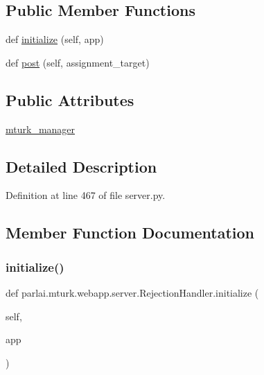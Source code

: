 \subsection*{Public Member Functions}
\begin{DoxyCompactItemize}
\item 
def \hyperlink{classparlai_1_1mturk_1_1webapp_1_1server_1_1RejectionHandler_af55902f1aecca9cde35328c8356525ce}{initialize} (self, app)
\item 
def \hyperlink{classparlai_1_1mturk_1_1webapp_1_1server_1_1RejectionHandler_ab53a292bed562b166bd63ef81ae38a43}{post} (self, assignment\+\_\+target)
\end{DoxyCompactItemize}
\subsection*{Public Attributes}
\begin{DoxyCompactItemize}
\item 
\hyperlink{classparlai_1_1mturk_1_1webapp_1_1server_1_1RejectionHandler_add298625ab3b54fd34cc774e7eeb9e7c}{mturk\+\_\+manager}
\end{DoxyCompactItemize}


\subsection{Detailed Description}


Definition at line 467 of file server.\+py.



\subsection{Member Function Documentation}
\mbox{\label{classparlai_1_1mturk_1_1webapp_1_1server_1_1RejectionHandler_af55902f1aecca9cde35328c8356525ce}} 
\subsubsection{\texorpdfstring{initialize()}{initialize()}}
{\footnotesize\ttfamily def parlai.\+mturk.\+webapp.\+server.\+Rejection\+Handler.\+initialize (\begin{DoxyParamCaption}\item[{}]{self,  }\item[{}]{app }\end{DoxyParamCaption})}



